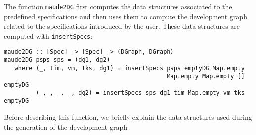 The function \verb"maude2DG" first computes the data structures associated to the
predefined specifications and then uses them to compute the development
graph related to the specifications introduced by the user. These
data structures are computed with \verb"insertSpecs":

{\codesize
\begin{verbatim}
maude2DG :: [Spec] -> [Spec] -> (DGraph, DGraph)
maude2DG psps sps = (dg1, dg2)
   where (_, tim, vm, tks, dg1) = insertSpecs psps emptyDG Map.empty 
                                              Map.empty Map.empty [] emptyDG
         (_,_, _, _, dg2) = insertSpecs sps dg1 tim Map.empty vm tks emptyDG
\end{verbatim}
}


Before describing this function,
we briefly explain the data structures used during the generation of
the development graph:

